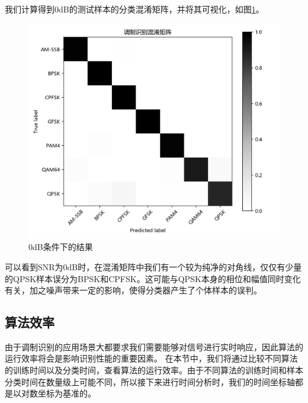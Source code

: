 我们计算得到0dB的测试样本的分类混淆矩阵，并将其可视化，如图\ref{sec:fig_3_10}。\par
\begin{figure}[!h]
	\centering
	\includegraphics[scale=0.7]{figures/chapter_3/fig_3_10}
	\caption{0dB条件下的结果}	\label{sec:fig_3_10}
\end{figure}
可以看到SNR为0dB时，在混淆矩阵中我们有一个较为纯净的对角线，仅仅有少量的QPSK样本误分为BPSK和CPFSK。这可能与QPSK本身的相位和幅值同时变化有关，加之噪声带来一定的影响，使得分类器产生了个体样本的误判。\par

\subsection{算法效率}

由于调制识别的应用场景大都要求我们需要能够对信号进行实时响应，因此算法的运行效率将会是影响识别性能的重要因素。
在本节中，我们将通过比较不同算法的训练时间以及分类时间，查看算法的运行效率。由于不同算法的训练时间和样本分类时间在数量级上可能不同，所以接下来进行时间分析时，我们的时间坐标轴都是以对数坐标为基准的。\par

